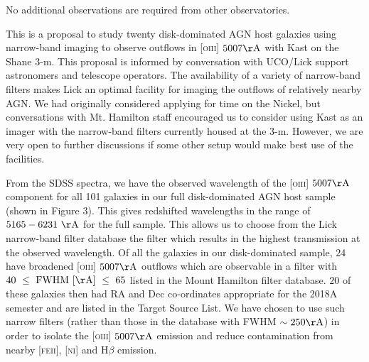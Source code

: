 \documentclass[12pt]{article}
\begin{document}
\vspace{0.25em}
\newpage


\vspace{0.25em}

\noindent No additional observations are required from other observatories.

\vspace{0.25em}


\vspace{0.25em}
This is a proposal to study twenty disk-dominated AGN host galaxies using narrow-band imaging to observe outflows in \textsc{[oiii]} $5007\rm{\AA}$ with Kast on the Shane 3-m. This proposal is informed by conversation with UCO/Lick support astronomers and telescope operators. The availability of a variety of narrow-band filters makes Lick an optimal facility for imaging the outflows of relatively nearby AGN. We had originally considered applying for time on the Nickel, but conversations with Mt. Hamilton staff encouraged us to consider using Kast as an imager with the narrow-band filters currently housed at the 3-m. However, we are very open to further discussions if some other setup would make best use of the facilities.
\vspace{0.25em}


\vspace{0.25em}

From the SDSS spectra, we have the observed  wavelength of the \textsc{[oiii]} $5007\rm{\AA}$ component for all 101 galaxies in our full disk-dominated AGN host sample (shown in Figure 3). This gives redshifted wavelengths in the range of $5165-6231~\rm{\AA}$ for the full sample. This allows us to choose from the Lick narrow-band filter database the filter which results in the highest transmission at the observed wavelength. Of all the galaxies in our disk-dominated sample, 24 have broadened \textsc{[oiii]} $5007\rm{\AA}$ outflows  which are observable in a filter with $40~\leq~\rm{FWHM}~[\rm{\AA}]~\leq~65$ listed in the Mount Hamilton filter database. $20$ of these galaxies then had RA and Dec co-ordinates appropriate for the 2018A semester and are listed in the Target Source List. We have chosen to use such narrow filters (rather than those in the database with FWHM $\sim250\rm{\AA}$) in order to isolate the \textsc{[oiii]} $5007\rm{\AA}$ emission and reduce contamination from nearby \textsc{[feii]}, \textsc{[ni]} and H$\beta$ emission. 
\vspace{0.25em}
\end{document}
